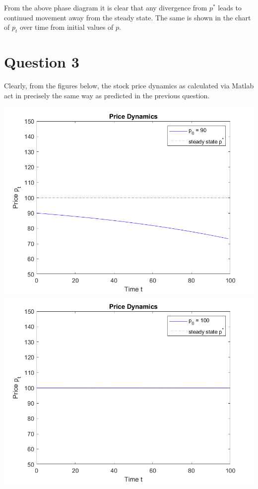 \documentclass[11pt]{article} %
\begin{document}
From the above phase diagram it is clear that any divergence from $p^{*}$ leads to continued movement away from the steady state. The same is shown in the chart of $p_t$ over time from initial values of $p$.

\section{Question 3}
Clearly, from the figures below, the stock price dynamics as calculated via Matlab act in precisely the same way as predicted in the previous question.

\includegraphics{dynamics_90} \\
\includegraphics{dynamics_100} \\
\end{document}
